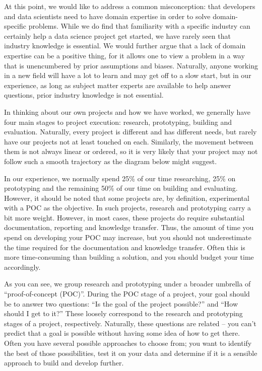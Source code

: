 \documentclass[
]{book}
\begin{document}
At this point, we would like to address a common misconception: that developers and data scientists need to have domain expertise in order to solve domain-specific problems. While we do find that familiarity with a specific industry can certainly help a data science project get started, we have rarely seen that industry knowledge is essential. We would further argue that a lack of domain expertise can be a positive thing, for it allows one to view a problem in a way that is unencumbered by prior assumptions and biases. Naturally, anyone working in a new field will have a lot to learn and may get off to a slow start, but in our experience, as long as subject matter experts are available to help answer questions, prior industry knowledge is not essential.

In thinking about our own projects and how we have worked, we generally have four main stages to project execution: research, prototyping, building and evaluation. Naturally, every project is different and has different needs, but rarely have our projects not at least touched on each. Similarly, the movement between them is not always linear or ordered, so it is very likely that your project may not follow such a smooth trajectory as the diagram below might suggest.

In our experience, we normally spend 25\% of our time researching, 25\% on prototyping and the remaining 50\% of our time on building and evaluating. However, it should be noted that some projects are, by definition, experimental with a POC as the objective. In such projects, research and prototyping carry a bit more weight. However, in most cases, these projects do require substantial documentation, reporting and knowledge transfer. Thus, the amount of time you spend on developing your POC may increase, but you should not underestimate the time required for the documentation and knowledge transfer. Often this is more time-consuming than building a solution, and you should budget your time accordingly.

As you can see, we group research and prototyping under a broader umbrella of ``proof-of-concept (POC)''. During the POC stage of a project, your goal should be to answer two questions: ``Is the goal of the project possible?'' and ``How should I get to it?'' These loosely correspond to the research and prototyping stages of a project, respectively. Naturally, these questions are related -- you can't predict that a goal is possible without having some idea of how to get there. Often you have several possible approaches to choose from; you want to identify the best of those possibilities, test it on your data and determine if it is a sensible approach to build and develop further.
\end{document}
